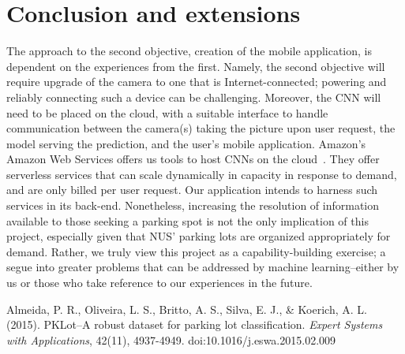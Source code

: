 \documentclass[a4paper, 11pt]{article} %
\begin{document}
\section{Conclusion and extensions}
The approach to the second objective, creation of the mobile application, is dependent on the 
experiences from the first. Namely, the second objective will require upgrade of the camera to one 
that is Internet-connected; powering and reliably connecting such a device can be challenging. 
Moreover, the CNN will need to be placed on the cloud, with a suitable interface to handle 
communication between the camera(s) taking the picture upon user request, the model serving 
the prediction, and the user's mobile application. Amazon's Amazon Web Services offers us tools 
to host CNNs on the cloud~\cite{aws}\relax. They offer serverless services that can scale 
dynamically in capacity in response to demand, and are only billed per user request. Our 
application intends to harness such services in its back-end.
Nonetheless, increasing the resolution of information available to 
those seeking a parking spot is not the only implication of this project, especially given that NUS' 
parking lots are organized appropriately for demand. Rather, we truly view this project as a 
capability-building exercise; a segue into greater problems that can be addressed by machine 
learning--either by us or those who take reference to our experiences in the future.

\newpage
\begin{thebibliography}{unsrt}
		Almeida, P. R., Oliveira, L. S., Britto, A. S., Silva, E. J., \& Koerich, A. L. (2015). PKLot--A robust 
		dataset for parking lot classification. \textit{Expert Systems with Applications}, 42(11), 
		4937-4949. doi:10.1016/j.eswa.2015.02.009
\end{thebibliography}
\end{document}
